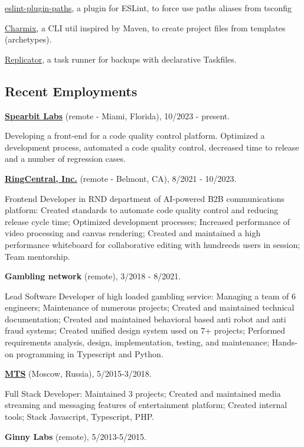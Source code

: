 \documentclass{vitonsky}
\begin{document}
\href{https://github.com/vitonsky/eslint-plugin-paths}{eslint-plugin-paths}, a plugin for ESLint, to force use paths aliases from tsconfig

\href{https://github.com/vitonsky/charmix}{Charmix}, a CLI util inspired
by Maven, to create project files from templates (archetypes).

\href{https://github.com/vitonsky/replicator}{Replicator}, a task runner
for backups with declarative Taskfiles.

\subsection*{Recent Employments}

\textbf{\href{https://spearbit.com/}{Spearbit Labs}} (remote -  Miami, Florida), 10/2023 - present.

Developing a front-end for a code quality control platform. Optimized a development process, automated a code quality control, decreased time to release and a number of regression cases.

\textbf{\href{https://www.ringcentral.com/}{RingCentral, Inc.}} (remote - Belmont, CA), 8/2021 - 10/2023.

Frontend Developer in RND department of AI-powered B2B communications platform: Created standards to automate code quality control and reducing release cycle time; Optimized development processes; Increased performance of video processing and canvas rendering; Created and maintained a high performance whiteboard for collaborative editing with hundreeds users in session; Team mentorship.

\textbf{Gambling network} (remote), 3/2018 - 8/2021.

Lead Software Developer of high loaded gambling service: Managing a team of 6 engineers; Maintenance of numerous projects; Created and maintained technical documentation; Created and maintained behavioral based anti robot and anti fraud systems; Created unified design system used on 7+ projects; Performed requirements analysis, design, implementation, testing, and maintenance; Hands-on programming in Typescript and Python.

\textbf{\href{https://mts.ru}{MTS}} (Moscow, Russia), 5/2015-3/2018.

Full Stack Developer: Maintained 3 projects; Created and maintained media streaming and messaging features of entertainment platform; Created internal tools; Stack Javascript, Typescript, PHP.

\textbf{Ginny Labs} (remote), 5/2013-5/2015.
\end{document}
